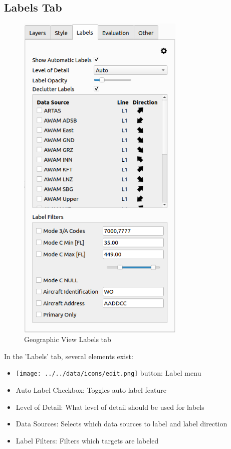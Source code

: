 \subsection{Labels Tab}
\label{sec:geoview_labels_tab} 
 
\begin{figure}[H]
   \center
    \includegraphics[width=8cm,frame]{figures/geoview_labels_tab.png}
  \caption{Geographic View Labels tab}
\end{figure}

In the 'Labels' tab, several elements exist:

\begin{itemize}
 \item \texttt{[image: ../../data/icons/edit.png]} button: Label menu 
 \item Auto Label Checkbox: Toggles auto-label feature
 \item Level of Detail: What level of detail should be used for labels
 \item Data Sources: Selects which data sources to label and label direction
 \item Label Filters: Filters which targets are labeled
\end{itemize} 
\ \\

